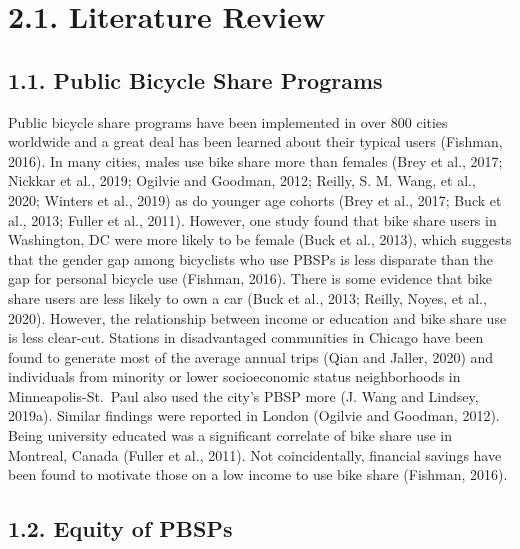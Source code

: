 \documentclass[]{elsarticle} %
\begin{document}
\hypertarget{literature-review}{%
\section{2.1. Literature Review}\label{literature-review}}

\hypertarget{public-bicycle-share-programs}{%
\subsection{1.1. Public Bicycle Share
Programs}\label{public-bicycle-share-programs}}

Public bicycle share programs have been implemented in over 800 cities
worldwide and a great deal has been learned about their typical users
(Fishman, 2016). In many cities, males use bike share more than females
(Brey et al., 2017; Nickkar et al., 2019; Ogilvie and Goodman, 2012;
Reilly, S. M. Wang, et al., 2020; Winters et al., 2019) as do younger
age cohorts (Brey et al., 2017; Buck et al., 2013; Fuller et al., 2011).
However, one study found that bike share users in Washington, DC were
more likely to be female (Buck et al., 2013), which suggests that the
gender gap among bicyclists who use PBSPs is less disparate than the gap
for personal bicycle use (Fishman, 2016). There is some evidence that
bike share users are less likely to own a car (Buck et al., 2013;
Reilly, Noyes, et al., 2020). However, the relationship between income
or education and bike share use is less clear-cut. Stations in
disadvantaged communities in Chicago have been found to generate most of
the average annual trips (Qian and Jaller, 2020) and individuals from
minority or lower socioeconomic status neighborhoods in
Minneapolis-St.~Paul also used the city's PBSP more (J. Wang and
Lindsey, 2019a). Similar findings were reported in London (Ogilvie and
Goodman, 2012). Being university educated was a significant correlate of
bike share use in Montreal, Canada (Fuller et al., 2011). Not
coincidentally, financial savings have been found to motivate those on a
low income to use bike share (Fishman, 2016).

\hypertarget{equity-of-pbsps}{%
\subsection{1.2. Equity of PBSPs}\label{equity-of-pbsps}}
\end{document}
